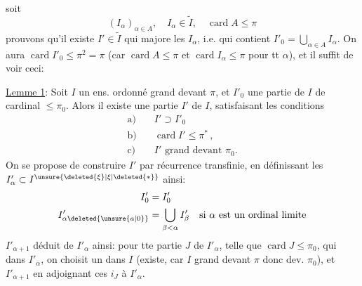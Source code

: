 soit
\[
(I_\alpha)_{\alpha\in A},\quad I_\alpha\in\widetilde I,\quad\operatorname{card}A\leq\pi
\]
 prouvons qu'il existe $I'\in\widetilde I$ qui majore les $I_\alpha$, i.e. qui contient $I'_0=\bigcup_{\alpha\in A}I_\alpha$. On aura $\operatorname{card}I'_0\leq\pi^2=\pi$ (car $\operatorname{card}A\leq\pi$ et $\operatorname{card}I_\alpha\leq\pi$ pour tt $\alpha$), et il suffit de voir ceci:

\uline{Lemme 1}: Soit  $I$ un ens. ordonné grand devant $\pi$, et $I'_0$ une partie de $I$ de cardinal $\leq\pi_0$. Alors il existe une partie $I'$ de $I$,  satisfaisant les conditions
\[
\begin{aligned}
\text{a)}\quad&I'\supset I'_0\\
\text{b)}\quad&\operatorname{card}I'\leq\pi^{\ast}\,,\\
\text{c)}\quad&I'\text{ grand devant }\pi_0.
\end{aligned}
\]
On se propose de construire $I'$ par récurrence transfinie, en définissant les $I'_\alpha\subset I^{\unsure{\deleted{\xi}|\xi|\deleted{\ast}}}$ ainsi:
\[
\begin{aligned}
I'_0&=I'_0\\
I'_{\alpha\deleted{\unsure{a|0}}}&=\bigcup_{\beta<\alpha}I'_\beta\quad\text{si }\alpha\text{ est un ordinal limite}
\end{aligned}
\]
$I'_{\alpha+1}$ déduit de $I'_\alpha$ ainsi: pour tte partie $J$ de $I'_\alpha$, telle que $\operatorname{card}J\leq\pi_0$, qui  dans $I'_\alpha$, on choisit un   dans $I$ (existe, car $I$ grand devant $\pi$ donc dev. $\pi_0$), et $I'_{\alpha+1}$  en adjoignant ces $i_J$ à $I'_\alpha$.

